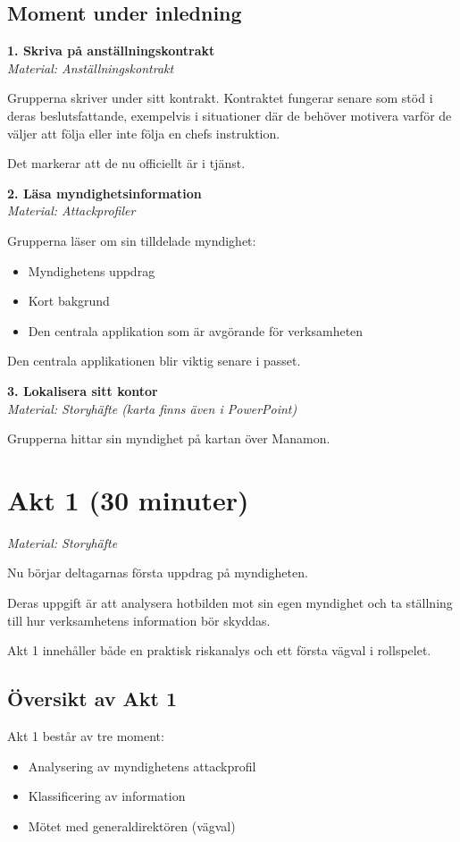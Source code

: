 \documentclass{article}
\begin{document}
\subsection{Moment under inledning}
\textbf{1. Skriva på anställningskontrakt} \\
\textit{Material: Anställningskontrakt}

Grupperna skriver under sitt kontrakt.
Kontraktet fungerar senare som stöd i deras beslutsfattande, exempelvis i situationer där de behöver motivera varför de väljer att följa eller inte följa en chefs instruktion.

Det markerar att de nu officiellt är i tjänst.

\textbf{2. Läsa myndighetsinformation} \\
\textit{Material: Attackprofiler}

Grupperna läser om sin tilldelade myndighet:
\begin{itemize}
    \item Myndighetens uppdrag
    \item Kort bakgrund
    \item Den centrala applikation som är avgörande för verksamheten
\end{itemize}
Den centrala applikationen blir viktig senare i passet.

\textbf{3. Lokalisera sitt kontor} \\
\textit{Material: Storyhäfte (karta finns även i PowerPoint)}

Grupperna hittar sin myndighet på kartan över Manamon.

\section{Akt 1 (30 minuter)}
\textit{Material: Storyhäfte}

Nu börjar deltagarnas första uppdrag på myndigheten.

Deras uppgift är att analysera hotbilden mot sin egen myndighet och ta ställning till hur verksamhetens information bör skyddas.

Akt 1 innehåller både en praktisk riskanalys och ett första vägval i rollspelet.

\subsection{Översikt av Akt 1}

Akt 1 består av tre moment:
\begin{itemize}
    \item Analysering av myndighetens attackprofil
    \item Klassificering av information
    \item Mötet med generaldirektören (vägval)
\end{itemize}
\end{document}
